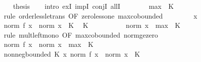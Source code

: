 \begin{isabellebody}
\ \ \isamarkupfalse%
\ {\isacharquery}{\kern0pt}thesis\isanewline
\ \ \isamarkupfalse%
\ {\isacharparenleft}{\kern0pt}intro\ exI\ impI\ conjI\ allI{\isacharparenright}{\kern0pt}\isanewline
\ \ \ \ \isamarkupfalse%
\ {\isachardoublequoteopen}{}\ {\isacharless}{\kern0pt}\ max\ {}\ K{\isachardoublequoteclose}\isanewline
\ \ \ \ \ \ \isamarkupfalse%
\ {\isacharparenleft}{\kern0pt}rule\ order{\isacharunderscore}{\kern0pt}less{\isacharunderscore}{\kern0pt}le{\isacharunderscore}{\kern0pt}trans\ {\isacharbrackleft}{\kern0pt}OF\ zero{\isacharunderscore}{\kern0pt}less{\isacharunderscore}{\kern0pt}one\ max{\isachardot}{\kern0pt}cobounded{}{\isacharbrackright}{\kern0pt}{\isacharparenright}{\kern0pt}\isanewline
\ \ \isamarkupfalse%
\isanewline
\ \ \ \ \isamarkupfalse%
\ x\isanewline
\ \ \ \ \isamarkupfalse%
\ {\isachardoublequoteopen}norm\ {\isacharparenleft}{\kern0pt}f\ x{\isacharparenright}{\kern0pt}\ {\isasymle}\ norm\ x\ {\isacharasterisk}{\kern0pt}\ K{\isachardoublequoteclose}\ \isamarkupfalse%
\ K\ \isacommand{{\isachardot}{\kern0pt}}\isamarkupfalse%
\isanewline
\ \ \ \ \isamarkupfalse%
\ \isamarkupfalse%
\ {\isachardoublequoteopen}{\isasymdots}\ {\isasymle}\ norm\ x\ {\isacharasterisk}{\kern0pt}\ max\ {}\ K{\isachardoublequoteclose}\isanewline
\ \ \ \ \ \ \isamarkupfalse%
\ {\isacharparenleft}{\kern0pt}rule\ mult{\isacharunderscore}{\kern0pt}left{\isacharunderscore}{\kern0pt}mono\ {\isacharbrackleft}{\kern0pt}OF\ max{\isachardot}{\kern0pt}cobounded{}\ norm{\isacharunderscore}{\kern0pt}ge{\isacharunderscore}{\kern0pt}zero{\isacharbrackright}{\kern0pt}{\isacharparenright}{\kern0pt}\isanewline
\ \ \ \ \isamarkupfalse%
\ \isamarkupfalse%
\ {\isachardoublequoteopen}norm\ {\isacharparenleft}{\kern0pt}f\ x{\isacharparenright}{\kern0pt}\ {\isasymle}\ norm\ x\ {\isacharasterisk}{\kern0pt}\ max\ {}\ K{\isachardoublequoteclose}\ \isacommand{{\isachardot}{\kern0pt}}\isamarkupfalse%
\isanewline
\ \ \isamarkupfalse%
\isanewline
{}\isamarkupfalse%
%
\endisatagproof
{\isafoldproof}%
%
\isadelimproof
\isanewline
%
\endisadelimproof
\isanewline
{}\isamarkupfalse%
\ nonneg{\isacharunderscore}{\kern0pt}bounded{\isacharcolon}{\kern0pt}\ {\isachardoublequoteopen}{\isasymexists}K{\isasymge}{}{\isachardot}{\kern0pt}\ {\isasymforall}x{\isachardot}{\kern0pt}\ norm\ {\isacharparenleft}{\kern0pt}f\ x{\isacharparenright}{\kern0pt}\ {\isasymle}\ norm\ x\ {\isacharasterisk}{\kern0pt}\ K{\isachardoublequoteclose}\isanewline

\end{isabellebody}
